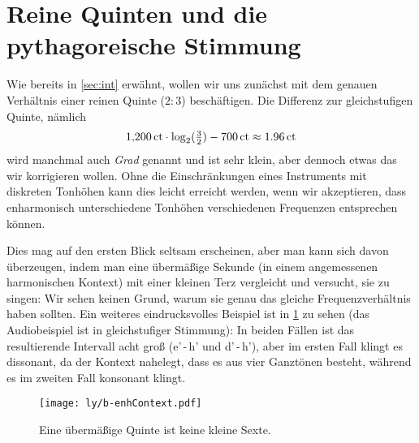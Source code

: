 \documentclass[ngerman,11pt]{scrartcl}
\begin{document}
\section{Reine Quinten und die pythagoreische Stimmung}
\label{sec:pyth}

Wie bereits in \cref{sec:int} erwähnt, wollen wir uns zunächst mit dem genauen
Verhältnis einer reinen Quinte ($2:3$) beschäftigen. Die Differenz zur
gleichstufigen Quinte, nämlich
\[1{,}200\,\mathrm{ct}\cdot \log_2(\tfrac32) - 700\,\mathrm{ct} \approx 1.96\,\mathrm{ct}\]%
wird manchmal auch \emph{Grad} genannt
und ist sehr klein, aber dennoch etwas das wir korrigieren wollen. Ohne die
Einschränkungen eines Instruments mit diskreten Tonhöhen kann dies leicht
erreicht werden, wenn wir akzeptieren, dass enharmonisch unterschiedene
Tonhöhen verschiedenen Frequenzen entsprechen können.

Dies mag auf den ersten Blick seltsam erscheinen, aber man kann sich davon
überzeugen, indem man eine übermäßige Sekunde (in einem angemessenen
harmonischen Kontext) mit einer kleinen Terz vergleicht und versucht, sie zu
singen: Wir sehen keinen Grund, warum sie genau das gleiche Frequenzverhältnis
haben sollten. Ein weiteres eindrucksvolles Beispiel ist in
\cref{fig:enhContext} zu sehen (das Audiobeispiel ist in gleichstufiger
Stimmung): In beiden Fällen ist das resultierende Intervall acht  groß
(\flat e’\,-\,h’ und \sharp d’\,-\,h’), aber im ersten Fall klingt es
dissonant, da der Kontext nahelegt, dass es aus vier Ganztönen besteht, während
es im zweiten Fall konsonant klingt.

\begin{figure}[h]
  \centering
  \texttt{[image: ly/b-enhContext.pdf]}
  \caption{Eine übermäßige Quinte ist keine kleine Sexte.}\label{fig:enhContext}
\end{figure}
\end{document}
